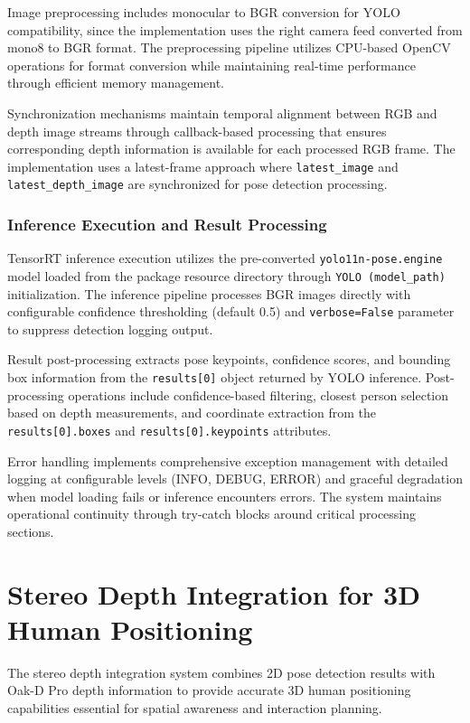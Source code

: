 Image preprocessing includes monocular to BGR conversion for YOLO compatibility, since the implementation uses the right camera feed converted from mono8 to BGR format. The preprocessing pipeline utilizes CPU-based OpenCV operations for format conversion while maintaining real-time performance through efficient memory management.

Synchronization mechanisms maintain temporal alignment between RGB and depth image streams through callback-based processing that ensures corresponding depth information is available for each processed RGB frame. The implementation uses a latest-frame approach where \texttt{latest\_image} and \texttt{latest\_depth\_image} are synchronized for pose detection processing.

\subsubsection{Inference Execution and Result Processing}

TensorRT inference execution utilizes the pre-converted \texttt{yolo11n-pose.engine} model loaded from the package resource directory through \texttt{YOLO (model\_path)} initialization. The inference pipeline processes BGR images directly with configurable confidence thresholding (default 0.5) and \texttt{verbose=False} parameter to suppress detection logging output.

Result post-processing extracts pose keypoints, confidence scores, and bounding box information from the \texttt{results[0]} object returned by YOLO inference. Post-processing operations include confidence-based filtering, closest person selection based on depth measurements, and coordinate extraction from the \texttt{results[0].boxes} and \texttt{results[0].keypoints} attributes.

Error handling implements comprehensive exception management with detailed logging at configurable levels (INFO, DEBUG, ERROR) and graceful degradation when model loading fails or inference encounters errors. The system maintains operational continuity through try-catch blocks around critical processing sections.

\section{Stereo Depth Integration for 3D Human Positioning}

The stereo depth integration system combines 2D pose detection results with Oak-D Pro depth information to provide accurate 3D human positioning capabilities essential for spatial awareness and interaction planning.

